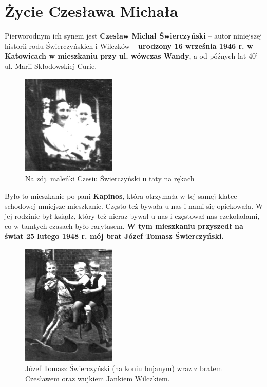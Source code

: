 \clearpage
\section{Życie Czesława Michała}
Pierworodnym ich synem jest \textbf{Czesław Michał Świerczyński} -- autor niniejszej historii rodu Świerczyńskich i Wilczków – \textbf{urodzony 16 września 1946 r. w Katowicach w mieszkaniu przy ul. wówczas Wandy}, a od późnych lat 40’ ul. Marii Skłodowskiej Curie.
\begin{figure}[!h]
\begin{center}
\includegraphics[width=0.4\textwidth]{photo/czeslaw_swierczynski_roczek.jpg}
\caption[Maleńki Czesiu Świerczyński u taty na rękach]{Na zdj. maleńki Czesiu Świerczyński u taty na rękach}
\end{center}
\end{figure}

Było to mieszkanie po pani \textbf{Kapinos}, która otrzymała w tej samej klatce schodowej mniejsze mieszkanie. Często też bywała u nas i nami się opiekowała. W jej rodzinie był ksiądz, który też nieraz bywał u nas i częstował nas czekoladami, co w tamtych czasach było rarytasem. \textbf{W tym mieszkaniu przyszedł na świat 25 lutego 1948 r. mój brat Józef Tomasz Świerczyński.}
\begin{figure}[!h]
\begin{center}
\includegraphics[width=0.4\textwidth]{photo/jozef_tomasz_swierczynski.jpg}
\caption[Józef Tomasz Świerczyński na koniu bujanym]{Józef Tomasz Świerczyński (na koniu bujanym) wraz z bratem Czesławem oraz wujkiem Jankiem Wilczkiem.}
\end{center}
\end{figure}

